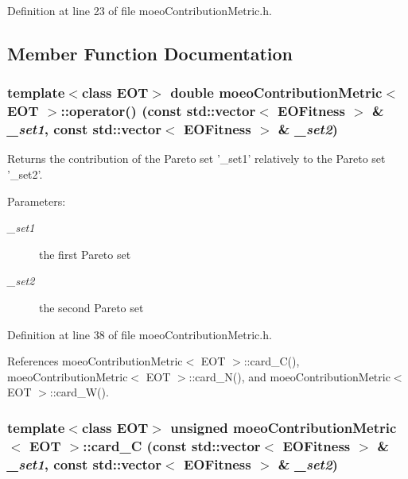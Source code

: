 Definition at line 23 of file moeo\-Contribution\-Metric.h.

\subsection{Member Function Documentation}
\subsubsection{\setlength{\rightskip}{0pt plus 5cm}template$<$class EOT$>$ double {\bf moeo\-Contribution\-Metric}$<$ EOT $>$::operator() (const std::vector$<$ {\bf EOFitness} $>$ \& {\em \_\-set1}, const std::vector$<$ {\bf EOFitness} $>$ \& {\em \_\-set2})\hspace{0.3cm}{\tt  [inline]}}\label{classmoeoContributionMetric_76b6b93124263ca1a8232b12a556d843}


Returns the contribution of the Pareto set '\_\-set1' relatively to the Pareto set '\_\-set2'. 

\begin{Desc}
\item[Parameters:]
\begin{description}
\item[{\em \_\-set1}]the first Pareto set \item[{\em \_\-set2}]the second Pareto set \end{description}
\end{Desc}


Definition at line 38 of file moeo\-Contribution\-Metric.h.

References moeo\-Contribution\-Metric$<$ EOT $>$::card\_\-C(), moeo\-Contribution\-Metric$<$ EOT $>$::card\_\-N(), and moeo\-Contribution\-Metric$<$ EOT $>$::card\_\-W().
\subsubsection{\setlength{\rightskip}{0pt plus 5cm}template$<$class EOT$>$ unsigned {\bf moeo\-Contribution\-Metric}$<$ EOT $>$::card\_\-C (const std::vector$<$ {\bf EOFitness} $>$ \& {\em \_\-set1}, const std::vector$<$ {\bf EOFitness} $>$ \& {\em \_\-set2})\hspace{0.3cm}{\tt  [inline, private]}}\label{classmoeoContributionMetric_a0041e60c941dd1909f28fadcf011b87}


